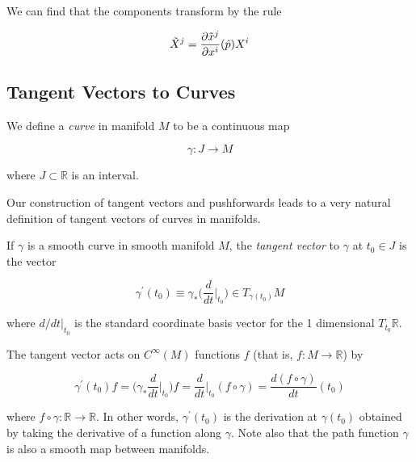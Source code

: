 \documentclass{article}
\newcounter{definition}[section]
\begin{document}
      We can find that the components transform by the rule 

        \begin{equation}
          \Tilde{X}^j = \frac{\partial \Tilde{x}^j}{\partial x^i} (\hat{p}) X^i
        \end{equation}

  \subsection{Tangent Vectors to Curves}

    \begin{definition}[Curve]
      \label{def:curve}
      We define a \textit{curve} in manifold $M$ to be a continuous map 

        \begin{equation}
          \gamma: J \to M
        \end{equation}

      where $J \subset \mathbb{R}$ is an interval. 
    \end{definition}

    Our construction of tangent vectors and pushforwards leads to a very natural definition of tangent vectors of curves in manifolds. 

    \begin{definition}
      \label{def:tangent-vector-to-a-curve}
      If $\gamma$ is a smooth curve in smooth manifold $M$, the \textit{tangent vector} to $\gamma$ at $t_0 \in J$ is the vector 

        \begin{equation}
          \gamma^\prime (t_0) \equiv \gamma_* \bigg( \frac{d}{dt} \bigg|_{t_0} \bigg) \in T_{\gamma(t_0)} M
        \end{equation}

      where $d/dt \big|_{t_0}$ is the standard coordinate basis vector for the 1 dimensional $T_{t_0} \mathbb{R}$. 
    \end{definition}

    The tangent vector acts on $C^\infty(M)$ functions $f$ (that is, $f: M \to \mathbb{R}$) by

      \begin{equation}
        \gamma^\prime (t_0) f = \bigg( \gamma_* \frac{d}{dt} \bigg|_{t_0} \bigg) f = \frac{d}{dt} \bigg|_{t_0} (f \circ \gamma) = \frac{d (f \circ \gamma)}{dt} (t_0)
      \end{equation}
    
    where $f \circ \gamma: \mathbb{R} \to \mathbb{R}$. In other words, $\gamma^\prime (t_0)$ is the derivation at $\gamma(t_0)$ obtained by taking the derivative of a function along $\gamma$. Note also that the path function $\gamma$ is also a smooth map between manifolds. 
\end{document}
